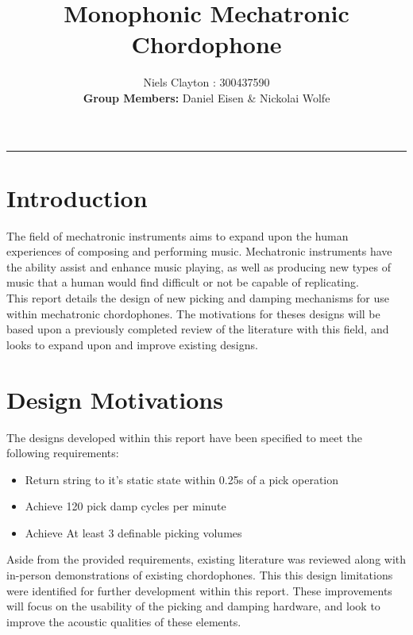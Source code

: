 \documentclass[a4paper,11pt]{article}
\begin{document}
\title{\LARGE{\textbf{Monophonic Mechatronic Chordophone}}}
\author{Niels Clayton : 300437590\\\textbf{Group Members:} Daniel Eisen \& Nickolai Wolfe}

\date{}
\maketitle
\hrule

\section{Introduction}

The field of mechatronic instruments aims to expand upon the human experiences of composing and performing music. Mechatronic instruments have the ability assist and enhance music playing, as well as producing new types of music that a human would find difficult or not be capable of replicating. \\

This report details the design of new picking and damping mechanisms for use within mechatronic chordophones. The motivations for theses designs will be based upon a previously completed review of the literature with this field, and looks to expand upon and improve existing designs.

\section{Design Motivations}\label{S:motivations}

The designs developed within this report have been specified to meet the following requirements:

\begin{itemize}
  \item Return string to it's static state within 0.25s of a pick operation 
  \item Achieve 120 pick damp cycles per minute
  \item Achieve At least 3 definable picking volumes
\end{itemize}

Aside from the provided requirements, existing literature was reviewed along with in-person demonstrations of existing chordophones. This this design limitations were identified for further development within this report. These improvements will focus on the usability of the picking and damping hardware, and look to improve the acoustic qualities of these elements.
\end{document}
